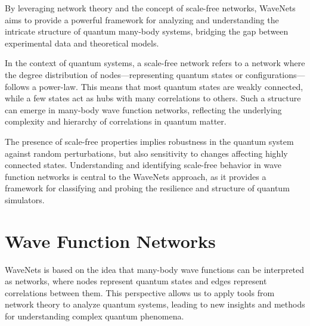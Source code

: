 \documentclass[a4paper, 11pt]{article}
\begin{document}
By leveraging network theory and the concept of scale-free networks, WaveNets aims to provide a powerful framework for analyzing and understanding the intricate structure of quantum many-body systems, bridging the gap between experimental data and theoretical models.




In the context of quantum systems, a scale-free network refers to a network where the degree distribution of nodes—representing quantum states or configurations—follows a power-law. This means that most quantum states are weakly connected, while a few states act as hubs with many correlations to others. Such a structure can emerge in many-body wave function networks, reflecting the underlying complexity and hierarchy of correlations in quantum matter. 

The presence of scale-free properties implies robustness in the quantum system against random perturbations, but also sensitivity to changes affecting highly connected states. Understanding and identifying scale-free behavior in wave function networks is central to the WaveNets approach, as it provides a framework for classifying and probing the resilience and structure of quantum simulators.

\section{Wave Function Networks}
WaveNets is based on the idea that many-body wave functions can be interpreted as networks, where nodes represent quantum states and edges represent correlations between them. This perspective allows us to apply tools from network theory to analyze quantum systems, leading to new insights and methods for understanding complex quantum phenomena.
\end{document}
